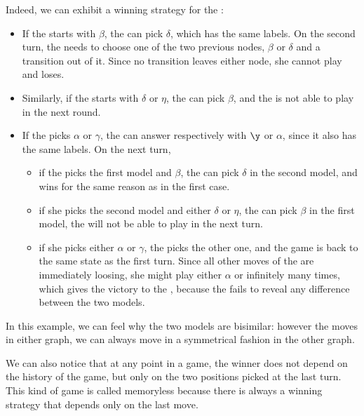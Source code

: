 \begin{example}
    Indeed, we can exhibit a winning strategy for the \Defender:
    \begin{itemize}
        \item If the \Attacker starts with $\beta$, the \Defender
            can pick $\delta$, which has the same labels.
            On the second turn, the \Attacker needs to choose
            one of the two previous nodes, $\beta$ or $\delta$
            and a transition out of it. Since no transition leaves either node,
            she cannot play and loses.
        \item Similarly, if the \Attacker starts with $\delta$ or $\eta$, the \Defender
            can pick $\beta$, and the \Attacker is not able to play in the next round.
        \item If the \Attacker picks $\alpha$ or $\gamma$,
            the \Defender can answer respectively with $\y$ or $\alpha$,
            since it also has the same labels. On the next turn,
            \begin{itemize}
                \item if the \Attacker
                    picks the first model and $\beta$, the \Defender can pick $\delta$
                    in the second model, and wins for the same reason as in the first case.
                \item if she picks the second model and either $\delta$ or $\eta$,
                    the \Defender can pick $\beta$ in the first model, the \Attacker will not be able to play
                    in the next turn.
                \item if she picks either $\alpha$ or $\gamma$,
                    the \Defender picks the other one, and the game is back to the same
                    state as the first turn.
                    Since all other moves of the \Attacker are immediately loosing,
                    she might play either $\alpha$ or \y infinitely many times,
                    which gives the victory to the \Defender, because the \Attacker
                    fails to reveal any difference between the two models.
            \end{itemize}
    \end{itemize}

    In this example, we can feel why the two models are bisimilar: however
    the \Attacker moves in either graph, we can always move in a symmetrical fashion in
    the other graph.

    We can also notice that at any point in a game, the winner does not depend on the history of the game,
    but only on the two positions picked at the last turn.
    This kind of game is called memoryless because there is always a winning strategy
    that depends only on the last move.
\end{example}

